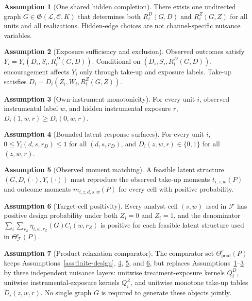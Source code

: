 \documentclass[11pt]{article}
\theoremstyle{definition}
\newtheorem{assumption}{Assumption}
\theoremstyle{plain}
\theoremstyle{remark}
\begin{document}
\begin{assumption}[One shared hidden completion]\label{ass:shared-completion}
There exists one undirected graph \(G\in\mathfrak G(\mathcal L,\mathcal C,K)\) that determines both \(R_i^D(G,D)\) and \(R_i^Z(G,Z)\) for all units and all realizations. Hidden-edge choices are not channel-specific nuisance variables.
\end{assumption}

\begin{assumption}[Exposure sufficiency and exclusion]\label{ass:exposure-exclusion}
Observed outcomes satisfy \(Y_i=Y_i(D_i,S_i,R_i^D(G,D))\). Conditional on \((D_i,S_i,R_i^D(G,D))\), encouragement affects \(Y_i\) only through take-up and exposure labels. Take-up satisfies \(D_i=D_i(Z_i,W_i,R_i^Z(G,Z))\).
\end{assumption}

\begin{assumption}[Own-instrument monotonicity]\label{ass:monotonicity}
For every unit \(i\), observed instrumental label \(w\), and hidden instrumental exposure \(r\), \(D_i(1,w,r)\ge D_i(0,w,r)\).
\end{assumption}

\begin{assumption}[Bounded latent response surfaces]\label{ass:bounded}
For every unit \(i\), \(0\le Y_i(d,s,r_D)\le 1\) for all \((d,s,r_D)\), and \(D_i(z,w,r)\in\{0,1\}\) for all \((z,w,r)\).
\end{assumption}

\begin{assumption}[Observed moment matching]\label{ass:moment-matching}
A feasible latent structure \((G,D_i(\cdot),Y_i(\cdot))\) must reproduce the observed take-up moments \(t_{i,z,w}(P)\) and outcome moments \(m_{i,z,d,s,w}(P)\) for every cell with positive probability.
\end{assumption}

\begin{assumption}[Target-cell positivity]\label{ass:positivity}
Every analyst cell \((s,w)\) used in \(\mathcal F\) has positive design probability under both \(Z_i=0\) and \(Z_i=1\), and the denominator \(\sum_i\sum_{r_Z}\eta_{i,w,r_Z}(G)C_i(w,r_Z)\) is positive for each feasible latent structure used in \(\Theta^{c}_{\mathcal F}(P)\).
\end{assumption}

\begin{assumption}[Product relaxation comparator]\label{ass:product-relaxation}
The comparator set \(\Theta^{c}_{\mathrm{prod}}(P)\) keeps Assumptions~\ref{ass:finite-design}, \ref{ass:bounded}, \ref{ass:moment-matching}, and \ref{ass:positivity}, but replaces Assumptions~\ref{ass:shared-completion}--\ref{ass:monotonicity} by three independent nuisance layers: unitwise treatment-exposure kernels \(Q_i^D\), unitwise instrumental-exposure kernels \(Q_i^Z\), and unitwise monotone take-up tables \(\widetilde D_i(z,w,r)\). No single graph \(G\) is required to generate these objects jointly.
\end{assumption}
\end{document}
